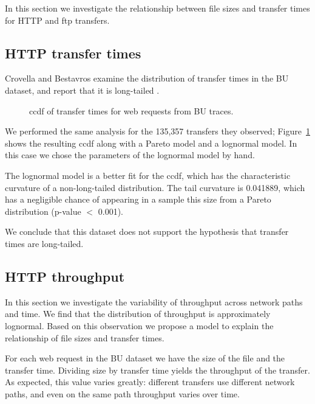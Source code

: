 \documentclass[twocolumn,11pt]{infocom}
\begin{document}
In this section we investigate the relationship between file sizes
and transfer times for HTTP and ftp transfers.


\subsection {HTTP transfer times}
\label{www}

Crovella and Bestavros examine the distribution of transfer
times in the BU dataset, and report that it is long-tailed
\cite{CrovellaBestavros96}.

\begin{figure}[tb]
\centerline{}
\caption{ccdf of transfer times for web requests from BU traces.}
\label{fig.transfer}
\end{figure}

We performed the same analysis for the 135,357 transfers they
observed; Figure~\ref{fig.transfer} shows the resulting ccdf along
with a Pareto model and a lognormal model.  In this case we chose the
parameters of the lognormal model by hand.

The lognormal model is a better fit for the ccdf, which has the
characteristic curvature of a non-long-tailed distribution.
The tail curvature is 0.041889, which has a negligible
chance of appearing in a sample this size from a Pareto distribution
(p-value $<$ 0.001).

We conclude that this dataset does not support the hypothesis that
transfer times are long-tailed.


\subsection{HTTP throughput}

In this section we investigate the variability of throughput
across network paths and time.  We find that the distribution of
throughput is approximately lognormal.  Based on this observation we
propose a model to explain the relationship of file sizes and transfer
times.


For each web request in the BU dataset we have the size of the
file and the transfer time.  Dividing size by transfer time yields
the throughput of the transfer.  As expected, this value
varies greatly: different transfers use different
network paths, and even on the same path throughput varies
over time.
\end{document}
